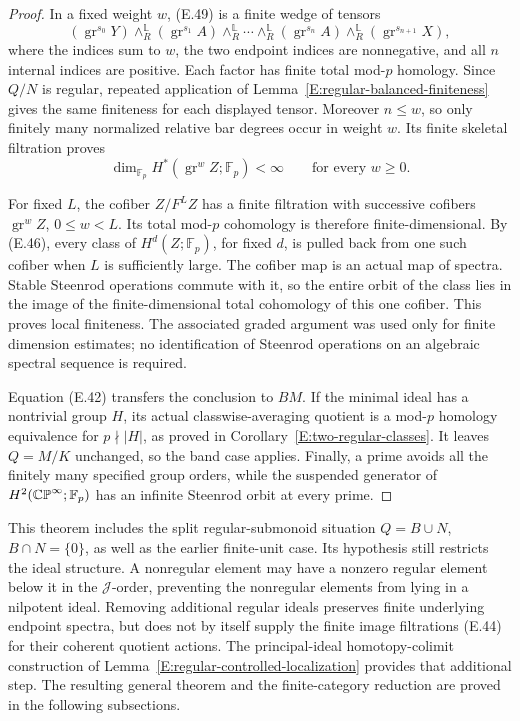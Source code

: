 \begin{proof}
In a fixed weight $w$, (E.49) is a finite wedge of tensors
\[
 (\operatorname{gr}^{s_0}Y)\wedge_R^{\mathbb L}
 (\operatorname{gr}^{s_1}A)\wedge_R^{\mathbb L}\cdots
 \wedge_R^{\mathbb L}(\operatorname{gr}^{s_n}A)
 \wedge_R^{\mathbb L}(\operatorname{gr}^{s_{n+1}}X),
\]
where the indices sum to $w$, the two endpoint indices are
nonnegative, and all $n$ internal indices are positive.
Each factor has finite total mod-$p$ homology.  Since $Q/N$ is
regular, repeated application of
Lemma~\ref{E:regular-balanced-finiteness} gives the same finiteness
for each displayed tensor.  Moreover $n\leq w$, so only finitely
many normalized relative bar degrees occur in weight $w$.
Its finite skeletal filtration proves
\[
 \dim_{\mathbb F_p}H^*(\operatorname{gr}^wZ;\mathbb F_p)
       <\infty\qquad\text{for every }w\geq0.          \tag{E.50}
\]

For fixed $L$, the cofiber $Z/F^LZ$ has a finite filtration with
successive cofibers $\operatorname{gr}^wZ$, $0\leq w<L$.
Its total mod-$p$ cohomology is therefore finite-dimensional.
By (E.46), every class of $H^d(Z;\mathbb F_p)$, for fixed $d$,
is pulled back from one such cofiber when $L$ is sufficiently
large.  The cofiber map is an actual map of spectra.  Stable
Steenrod operations commute with it, so the entire orbit of the
class lies in the image of the finite-dimensional total
cohomology of this one cofiber.  This proves local finiteness.
The associated graded argument was used only for finite dimension
estimates; no identification of Steenrod operations on an
algebraic spectral sequence is required.

Equation (E.42) transfers the conclusion to $BM$.  If the minimal
ideal has a nontrivial group $H$, its actual classwise-averaging
quotient is a mod-$p$ homology equivalence for $p\nmid|H|$, as
proved in Corollary~\ref{E:two-regular-classes}.  It leaves $Q=M/K$
unchanged, so the band case applies.  Finally, a prime avoids all
the finitely many specified group orders, while the suspended
generator of $H^2(\mathbb {CP}^\infty;\mathbb F_p)$ has an infinite
Steenrod orbit at every prime.
\end{proof}

\begin{remark}\label{E:regular-quotient-scope}
This theorem includes the split regular-submonoid situation
$Q=B\cup N$, $B\cap N=\{0\}$, as well as the earlier finite-unit
case.  Its hypothesis still restricts the ideal structure.
A nonregular element may have a nonzero regular element below it
in the $\mathcal J$-order, preventing the nonregular elements from
lying in a nilpotent ideal.  Removing additional regular ideals
preserves finite underlying endpoint spectra, but does not by
itself supply the finite image filtrations (E.44) for their
coherent quotient actions.  The principal-ideal homotopy-colimit
construction of Lemma~\ref{E:regular-controlled-localization}
provides that additional step.  The resulting general theorem and
the finite-category reduction are proved in the following subsections.
\end{remark}
